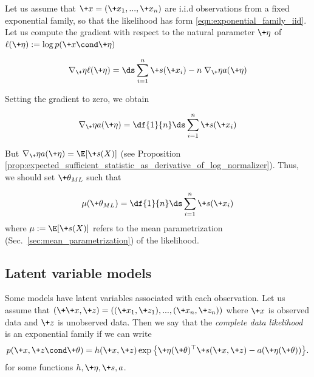 \documentclass{article} %
\newcommand{\obs}{\+x}
\newcommand{\logNormalizerFunction}{a}
\newcommand{\sufficientStatsFunction}{\+s}
\newcommand{\carrierDensity}{h}
\newcommand{\meanParameter}{\mu}
\newcommand{\param}{\+\theta}
\newcommand{\naturalParam}{\+\eta}
\begin{document}
Let us assume that $\+x=(\obs_1, ..., \obs_n)$ are i.i.d observations  from a fixed exponential family, so that the likelihood has form \eqref{eqn:exponential_family_iid}.  Let us compute the gradient with respect to the natural parameter $\naturalParam$ of $\ell(\naturalParam) := \log p(\obs \cond \naturalParam)$

\[ \nabla_\naturalParam \ell(\naturalParam) = \ds\sum_{i=1}^n \sufficientStatsFunction(\obs_i) - n \; \nabla_\naturalParam \logNormalizerFunction(\naturalParam) \]

Setting the gradient to zero, we obtain

\[ \nabla_\naturalParam \logNormalizerFunction(\naturalParam) = \df{1}{n}  \ds\sum_{i=1}^n \sufficientStatsFunction(\obs_i) \]

But $\nabla_\naturalParam \logNormalizerFunction(\naturalParam) = \E [\sufficientStatsFunction(X)]$  (see Proposition \ref{prop:expected_sufficient_statistic_as_derivative_of_log_normalizer}).  Thus, we should set $\param_{ML}$ such that
%

\begin{align}
\meanParameter(\param_{ML}) = \df{1}{n} \ds\sum_{i=1}^n \sufficientStatsFunction(\obs_i) 	
 \label{eqn:maximum_likelihood_solution_for_exponential_families}
\end{align}
%
where $\meanParameter:= \E[\sufficientStatsFunction(X)]$ refers to the mean parametrization (Sec.~\ref{sec:mean_parametrization}) of the likelihood.  

\subsection{Latent variable models}

Some models have latent variables associated with each observation.   Let us  assume that $(\+\obs, \+z)=((\obs_1,\+z_1), ..., (\obs_n, \+z_n))$ where $\+x$ is observed data and $\+z$ is unobserved data.   Then we say that the \textit{complete data likelihood} is an exponential family if we can write
%
\begin{align}
 p(\+x, \+z \cond \param) = \carrierDensity(\+x, \+z) \exp \big\{ \naturalParam(\param)^\top \sufficientStatsFunction(\+x, \+z) - \logNormalizerFunction(\naturalParam(\param))\big\}. 
\label{eqn:exponential_family_complete_data_likelihood}
 \end{align}
%
for some functions $\carrierDensity, \naturalParam, \sufficientStatsFunction, \logNormalizerFunction$. 
\end{document}

